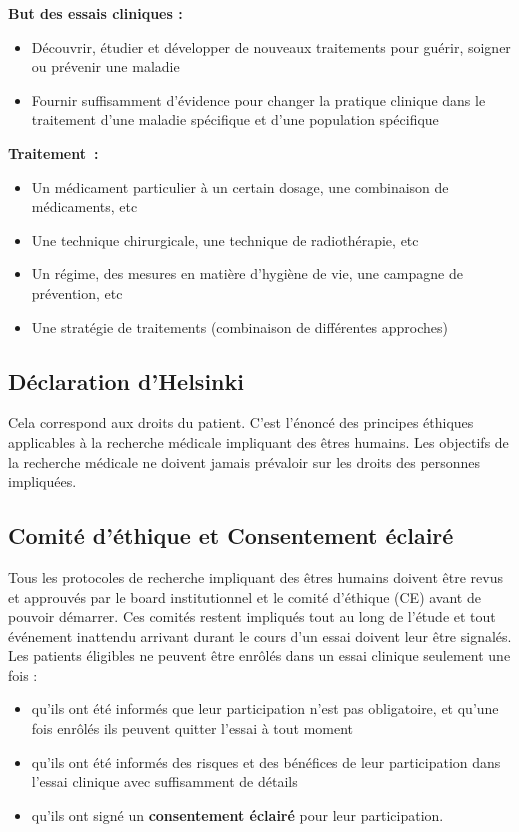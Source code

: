 \textbf{But des essais cliniques :}
\begin{itemize}
    \item Découvrir, étudier et développer de nouveaux traitements pour guérir, soigner ou prévenir une maladie
    \item Fournir suffisamment d’évidence pour changer la pratique clinique dans le traitement d’une maladie spécifique et d’une population spécifique
\end{itemize}

\vspace{0.15cm}
\textbf{ Traitement :}
\begin{itemize}
    \item Un médicament particulier à un certain dosage, une combinaison de médicaments, etc
    \item Une technique chirurgicale, une technique de radiothérapie, etc 
    \item Un régime, des mesures en matière d’hygiène de vie, une
campagne de prévention, etc
    \item Une stratégie de traitements (combinaison de différentes approches)
\end{itemize}


\subsection{Déclaration d’Helsinki}
Cela correspond aux droits du patient. C'est l'énoncé des principes éthiques applicables à la recherche médicale impliquant des êtres humains. Les objectifs de la recherche médicale ne doivent jamais prévaloir sur les droits des personnes impliquées.


\subsection{Comité d’éthique et Consentement éclairé}

Tous les protocoles de recherche impliquant des êtres humains doivent être revus et approuvés par le board institutionnel et le comité d’éthique (CE) avant de pouvoir démarrer. Ces comités restent impliqués tout au long de l'étude et tout événement inattendu arrivant durant le cours d’un essai doivent leur être signalés.\\

Les patients éligibles ne peuvent être enrôlés dans un essai clinique seulement une fois :
\begin{itemize}
    \item qu’ils ont été informés que leur participation n’est pas obligatoire, et qu’une fois enrôlés ils peuvent quitter l’essai à tout moment
    \item qu’ils ont été informés des risques et des bénéfices de leur participation dans l'essai clinique avec suffisamment de détails
    \item qu’ils ont signé un \textbf{consentement éclairé} pour leur participation.

\end{itemize}

